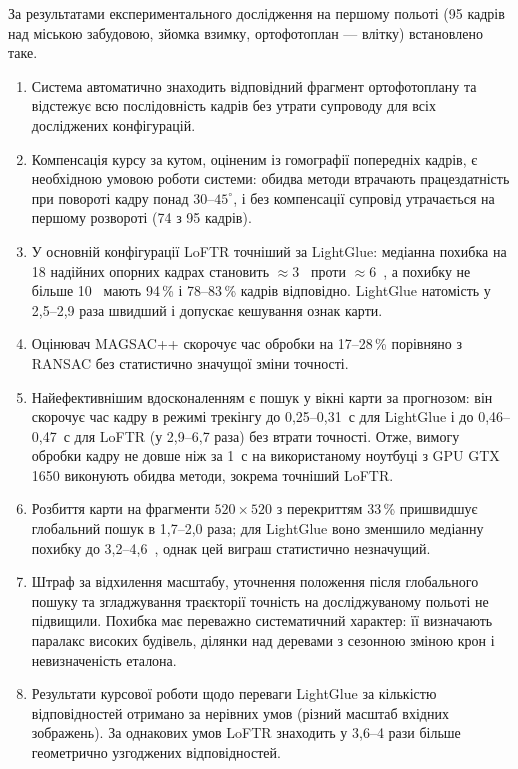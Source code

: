 \documentclass[a4paper, 12pt, titlepage]{article}
\begin{document}
За результатами експериментального дослідження на першому польоті (95 кадрів над міською забудовою, зйомка взимку, ортофотоплан --- влітку) встановлено таке.
\begin{enumerate}
    \item Система автоматично знаходить відповідний фрагмент ортофотоплану та відстежує всю послідовність кадрів без утрати супроводу для всіх досліджених конфігурацій.
    \item Компенсація курсу за кутом, оціненим із гомографії попередніх кадрів, є необхідною умовою роботи системи: обидва методи втрачають працездатність при повороті кадру понад $30$--$45^\circ$, і без компенсації супровід утрачається на першому розвороті (74 з 95 кадрів).
    \item У основній конфігурації LoFTR точніший за LightGlue: медіанна похибка на 18 надійних опорних кадрах становить $\approx 3$~\px{} проти $\approx 6$~\px{}, а похибку не більше 10~\px{} мають 94\,\% і 78--83\,\% кадрів відповідно. LightGlue натомість у 2,5--2,9 раза швидший і допускає кешування ознак карти.
    \item Оцінювач MAGSAC++ скорочує час обробки на 17--28\,\% порівняно з RANSAC без статистично значущої зміни точності.
    \item Найефективнішим вдосконаленням є пошук у вікні карти за прогнозом: він скорочує час кадру в режимі трекінгу до 0,25--0,31~с для LightGlue і до 0,46--0,47~с для LoFTR (у 2,9--6,7 раза) без втрати точності. Отже, вимогу обробки кадру не довше ніж за 1~с на використаному ноутбуці з GPU GTX 1650 виконують обидва методи, зокрема точніший LoFTR.
    \item Розбиття карти на фрагменти $520 \times 520$ з перекриттям 33\,\% пришвидшує глобальний пошук в 1,7--2,0 раза; для LightGlue воно зменшило медіанну похибку до 3,2--4,6~\px{}, однак цей виграш статистично незначущий.
    \item Штраф за відхилення масштабу, уточнення положення після глобального пошуку та згладжування траєкторії точність на досліджуваному польоті не підвищили. Похибка має переважно систематичний характер: її визначають паралакс високих будівель, ділянки над деревами з сезонною зміною крон і невизначеність еталона.
    \item Результати курсової роботи щодо переваги LightGlue за кількістю відповідностей отримано за нерівних умов (різний масштаб вхідних зображень). За однакових умов LoFTR знаходить у 3,6--4 рази більше геометрично узгоджених відповідностей.
\end{enumerate}
\end{document}
